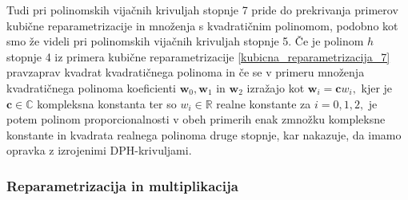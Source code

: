 \documentclass[12pt,a4paper,twoside]{article}
\theoremstyle{definition} %
\theoremstyle{plain} %
\theoremstyle{primerstyle}
\numberwithin{equation}{section}  %
\newcommand{\R}{\mathbb R}
\renewcommand{\C}{\mathbb C}
\newcommand{\cV}{\mathbf{c}}
\newcommand{\wV}{\mathbf{w}}
\begin{document}
Tudi pri polinomskih vijačnih krivuljah stopnje 7 pride do prekrivanja primerov kubične reparametrizacije in množenja s kvadratičnim polinomom, podobno kot smo že videli pri polinomskih vijačnih krivuljah stopnje 5. Če je polinom $h$ stopnje 4 iz primera kubične reparametrizacije \ref{kubicna_reparametrizacija_7} pravzaprav kvadrat kvadratičnega polinoma in če se v primeru množenja kvadratičnega polinoma koeficienti $\wV_0,\wV_1$ in $\wV_2$ izražajo kot $\wV_i=\cV w_i,$ kjer je $\cV\in\C$ kompleksna konstanta ter so $w_i\in\R$ realne konstante za $i=0,1,2,$ je potem polinom proporcionalnosti v obeh primerih enak zmnožku kompleksne konstante in kvadrata realnega polinoma druge stopnje, kar nakazuje, da imamo opravka z izrojenimi DPH-krivuljami.

\subsubsection{Reparametrizacija in multiplikacija}
\label{reparametrizacija_multiplikacija}
\end{document}
